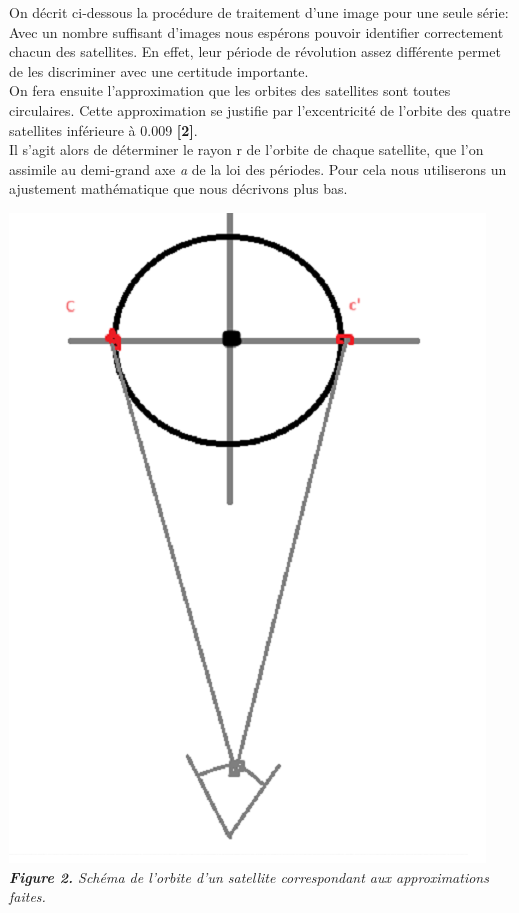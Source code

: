 \documentclass{aa}
\begin{document}
On décrit ci-dessous la procédure de traitement d'une image pour une seule série: \\




Avec un nombre suffisant d’images nous espérons pouvoir identifier correctement chacun des satellites. En effet, leur période de révolution assez différente permet de les discriminer avec une certitude importante. \\
On fera ensuite l’approximation que les orbites des satellites sont toutes circulaires. Cette approximation se justifie par l’excentricité de l'orbite des quatre satellites inférieure à 0.009 \textbf{[2]}. \\
Il s’agit alors de déterminer le rayon r de l’orbite de chaque satellite, que l’on assimile au demi-grand axe \emph{a} de la loi des périodes. Pour cela nous utiliserons un ajustement mathématique que nous décrivons plus bas. \\

\begin{center}
\includegraphics[scale = 0.6]{images/schema 3.png} \\
\emph{\textbf{Figure 2.} Schéma de l'orbite d'un satellite correspondant aux approximations faites.}
\end{center}
\end{document}
